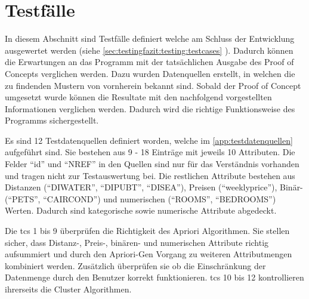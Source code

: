 \section{Testfälle}
\label{sec:recherche:testcases}

%

In diesem Abschnitt sind Testfälle definiert welche am Schluss der Entwicklung ausgewertet werden (siehe \cref{sec:testingfazit:testing:testcases} ). Dadurch können die Erwartungen an das Programm mit der tatsächlichen Ausgabe des Proof of Concepts verglichen werden. Dazu wurden Datenquellen erstellt, in welchen die zu findenden Mustern von vornherein bekannt sind. Sobald der Proof of Concept umgesetzt wurde können die Resultate mit den  nachfolgend vorgestellten Informationen verglichen werden. Dadurch wird die richtige Funktionsweise des Programms sichergestellt.

Es sind 12 Testdatenquellen definiert worden, welche im \cref{app:testdatenquellen} aufgeführt sind.
Sie bestehen aus 9 - 18 Einträge mit jeweils 10 Attributen. Die Felder "`id"' und "`NREF"' in den Quellen sind nur für das Verständnis vorhanden und tragen nicht zur Testauswertung bei. Die restlichen Attribute bestehen aus Distanzen ("`DIWATER"', "`DIPUBT"', "`DISEA"'), Preisen ("`weeklyprice"'), Binär- ("`PETS"', "`CAIRCOND"') und numerischen ("`ROOMS"', "`BEDROOMS"') Werten. Dadurch sind kategorische sowie numerische Attribute abgedeckt. 

Die \glspl{tc} 1 bis 9 überprüfen die Richtigkeit des Apriori Algorithmen. Sie stellen sicher, dass Distanz-, Preis-, binären- und numerischen Attribute richtig aufsummiert und durch den Apriori-Gen Vorgang zu weiteren Attributmengen kombiniert werden. Zusätzlich überprüfen sie ob die Einschränkung der Datenmenge durch den Benutzer korrekt funktionieren. \glspl{tc} 10 bis 12 kontrollieren ihrerseits die Cluster Algorithmen. 

